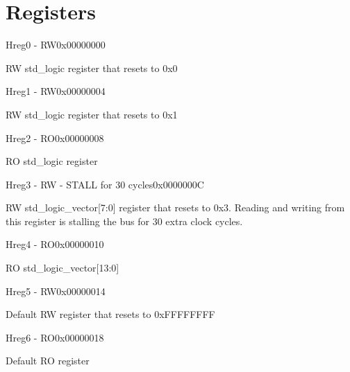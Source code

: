 \documentclass{article}
\begin{document}
\section{Registers}

\begin{register}{H}{reg0 - RW}{0x00000000}  \par RW std{\_}logic register that resets to 0x0 \regnewline
  \label{reg0}
\regnewline
\end{register}

\begin{register}{H}{reg1 - RW}{0x00000004}  \par RW std{\_}logic register that resets to 0x1 \regnewline
  \label{reg1}
\regnewline
\end{register}

\begin{register}{H}{reg2 - RO}{0x00000008}  \par RO std{\_}logic register \regnewline
  \label{reg2}
\regnewline
\end{register}

\begin{register}{H}{reg3 - RW - STALL for 30 cycles}{0x0000000C}  \par RW std{\_}logic{\_}vector[7:0] register that resets to 0x3. Reading and writing from this register is stalling the bus for 30 extra clock cycles. \regnewline
  \label{reg3}
\regnewline
\end{register}

\begin{register}{H}{reg4 - RO}{0x00000010}  \par RO std{\_}logic{\_}vector[13:0] \regnewline
  \label{reg4}
\regnewline
\end{register}

\begin{register}{H}{reg5 - RW}{0x00000014}  \par Default RW register that resets to 0xFFFFFFFF \regnewline
  \label{reg5}
\regnewline
\end{register}

\begin{register}{H}{reg6 - RO}{0x00000018}  \par Default RO register \regnewline
  \label{reg6}
\regnewline
\end{register}
\end{document}
